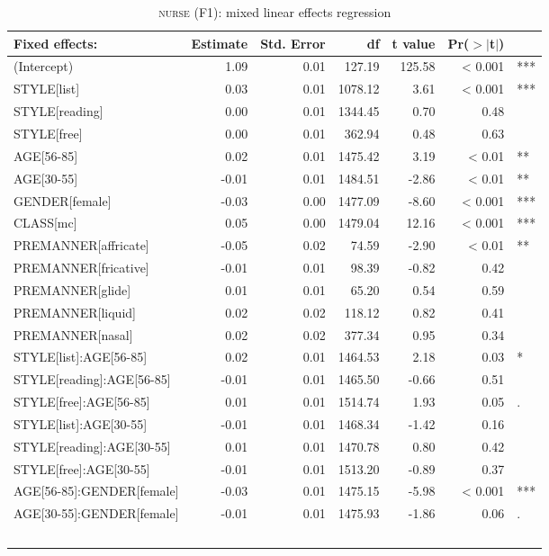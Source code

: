 {
	\footnotesize
	\begin{longtable}[c]{p{}rrrrrl}
		\caption{\textsc{nurse} (F1): mixed linear effects regression}\label{tab.regression.nurse.f1}\\
		
		\hline
		Fixed effects: & Estimate & Std. Error & df & t value & Pr($>$$|$t$|$) & \\ 
		\hline
		(Intercept) & 1.09 & 0.01 & 127.19 & 125.58 & < 0.001 & *** \\ 
		STYLE[list] & 0.03 & 0.01 & 1078.12 & 3.61 & < 0.001 & *** \\ 
		STYLE[reading] & 0.00 & 0.01 & 1344.45 & 0.70 & 0.48 & \\ 
		STYLE[free] & 0.00 & 0.01 & 362.94 & 0.48 & 0.63 & \\ 
		AGE[56-85] & 0.02 & 0.01 & 1475.42 & 3.19 & < 0.01 & ** \\ 
		AGE[30-55] & -0.01 & 0.01 & 1484.51 & -2.86 & < 0.01 & ** \\ 
		GENDER[female] & -0.03 & 0.00 & 1477.09 & -8.60 & < 0.001 & *** \\ 
		CLASS[mc] & 0.05 & 0.00 & 1479.04 & 12.16 & < 0.001 & *** \\ 
		PREMANNER[affricate] & -0.05 & 0.02 & 74.59 & -2.90 & < 0.01 & ** \\ 
		PREMANNER[fricative] & -0.01 & 0.01 & 98.39 & -0.82 & 0.42 & \\ 
		PREMANNER[glide] & 0.01 & 0.01 & 65.20 & 0.54 & 0.59 & \\ 
		PREMANNER[liquid] & 0.02 & 0.02 & 118.12 & 0.82 & 0.41 & \\ 
		PREMANNER[nasal] & 0.02 & 0.02 & 377.34 & 0.95 & 0.34 & \\ 
		STYLE[list]:AGE[56-85] & 0.02 & 0.01 & 1464.53 & 2.18 & 0.03 & * \\ 
		STYLE[reading]:AGE[56-85] & -0.01 & 0.01 & 1465.50 & -0.66 & 0.51 & \\ 
		STYLE[free]:AGE[56-85] & 0.01 & 0.01 & 1514.74 & 1.93 & 0.05 & .\\ 
		STYLE[list]:AGE[30-55] & -0.01 & 0.01 & 1468.34 & -1.42 & 0.16 & \\ 
		STYLE[reading]:AGE[30-55] & 0.01 & 0.01 & 1470.78 & 0.80 & 0.42 & \\ 
		STYLE[free]:AGE[30-55] & -0.01 & 0.01 & 1513.20 & -0.89 & 0.37 & \\ 
		AGE[56-85]:GENDER[female] & -0.03 & 0.01 & 1475.15 & -5.98 & < 0.001 & *** \\ 
		AGE[30-55]:GENDER[female] & -0.01 & 0.01 & 1475.93 & -1.86 & 0.06 & .\\ 
$$
\end{longtable}}

